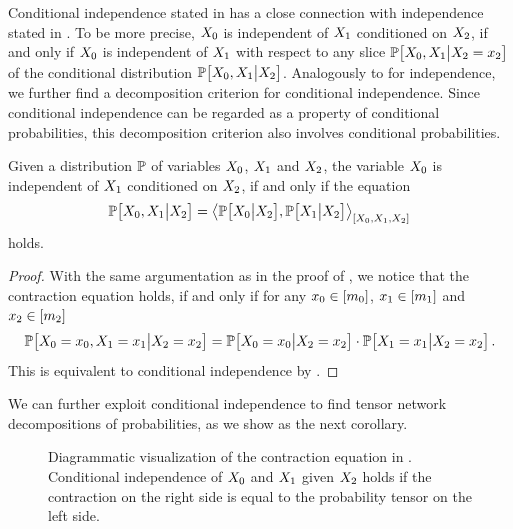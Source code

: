 Conditional independence stated in  has a close connection with independence stated in .
To be more precise, $X_{0}$ is independent of $X_{1}$ conditioned on $X_{2}$, if and only if $X_{0}$ is independent of $X_{1}$ with respect to any slice $\mathbb{P}\big[X_{0},X_{1}\big|X_{2}=x_{2}\big]$ of the conditional distribution $\mathbb{P}\big[X_{0},X_{1}\big|X_{2}\big]$.
Analogously to  for independence, we further find a decomposition criterion for conditional independence.
Since conditional independence can be regarded as a property of conditional probabilities, this decomposition criterion also involves conditional probabilities.

\begin{theorem}
    \label{the:condIndependenceProductCriterion}
    Given a distribution $\mathbb{P}$ of variables $X_{0}$, $X_{1}$ and $X_{2}$, the variable $X_{0}$ is independent of $X_{1}$ conditioned on $X_{2}$, if and only if the equation
    \begin{align*}
        \mathbb{P}\big[X_{0},X_{1}\big|X_{2}\big]
        = \left\langle 
            \mathbb{P}\big[X_{0}\big|X_{2}\big],\mathbb{P}\big[X_{1}\big|X_{2}\big]
        \right\rangle_{\left[ X_{0},X_{1},X_{2} \right]}
    \end{align*}
    holds.
\end{theorem}
\begin{proof}
    With the same argumentation as in the proof of , we notice that the contraction equation holds, if and only if for any $x_{0}\in[m_{0}]$, $x_{1}\in[m_{1}]$ and $x_{2}\in[m_{2}]$
    \begin{align*}
        \mathbb{P}\big[X_{0}=x_{0},X_{1}=x_{1}\big|X_{2}=x_{2}\big]
        = \mathbb{P}\big[X_{0}=x_{0}\big|X_{2}=x_{2}\big] \cdot \mathbb{P}\big[X_{1}=x_{1}\big|X_{2}=x_{2}\big] \, .
    \end{align*}
    This is equivalent to conditional independence by .
\end{proof}

We can further exploit conditional independence to find tensor network decompositions of probabilities, as we show as the next corollary.

\begin{figure}[t]
    \begin{center}
        
    \end{center}
    \caption{Diagrammatic visualization of the contraction equation in .
    Conditional independence of $X_{0}$ and $X_{1}$ given $X_{2}$ holds if the contraction on the right side is equal to the probability tensor on the left side.}
    \label{fig:condIndependenceDecomposition}
\end{figure}


